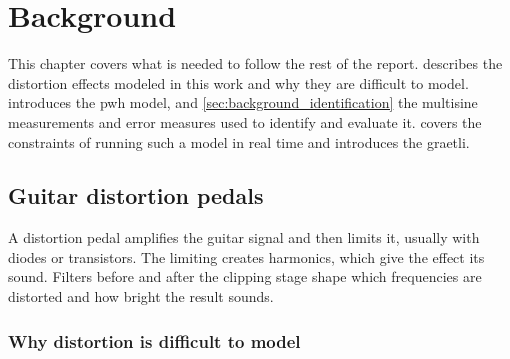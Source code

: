 



\chapter{Background}
\label{ch:background}

This chapter covers what is needed to follow the rest of the report.  describes the distortion effects modeled in this work and why they are difficult to model.  introduces the \gls{pwh} model, and \cref{sec:background_identification} the multisine measurements and error measures used to identify and evaluate it.  covers the constraints of running such a model in real time and introduces the graetli.


\section{Guitar distortion pedals}
\label{sec:background_pedals}

A distortion pedal amplifies the guitar signal and then limits it, usually with diodes or transistors. The limiting creates harmonics, which give the effect its sound. Filters before and after the clipping stage shape which frequencies are distorted and how bright the result sounds.

\subsection{Why distortion is difficult to model}
\label{subsec:background_hard_to_model}

